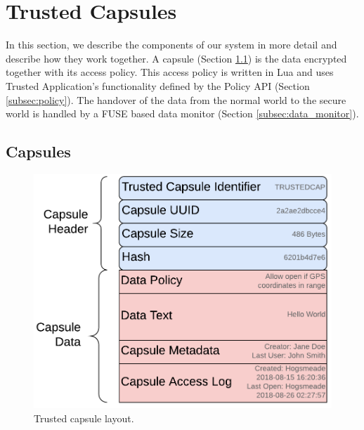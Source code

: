 \chapter{Trusted Capsules}
\label{ch:trustedcapsules}
In this section, we describe the components of our system in more detail and describe how they work together. A capsule (Section \ref{subsec:capsule}) is the data encrypted together with its access policy. This access policy is written in Lua and uses Trusted Application's functionality defined by  the Policy API (Section \ref{subsec:policy}). The handover of the data from the normal world to the secure world is handled by a FUSE based data monitor (Section \ref{subsec:data_monitor}).

\section{Capsules}
\label{subsec:capsule}
\begin{figure}
    \centering
    \includegraphics[width=\columnwidth]{fig/Fig2_Trusted_Capusle_Layout_New.pdf}
    \caption{Trusted capsule layout.}
    \label{fig:trustedcapsulelayout}
\end{figure}

